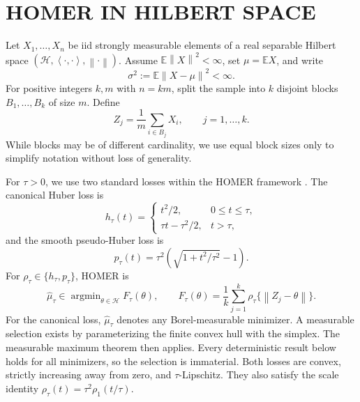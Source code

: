 \documentclass[twoside]{article}
\theoremstyle{definition}
\newcommand{\Hcal}{\mathcal H}
\newcommand{\E}{\mathbb E}
\newcommand{\norm}[1]{\left\lVert #1\right\rVert}
\newcommand{\ip}[2]{\left\langle #1,#2\right\rangle}
\newcommand{\argmin}{\mathop{\mathrm{argmin}}}
\begin{document}
\section{HOMER IN HILBERT SPACE}

Let $X_1,\ldots,X_n$ be iid strongly measurable elements of a real separable Hilbert space $(\Hcal,\ip{\cdot}{\cdot},\norm{\cdot})$. Assume $\E\norm X^2<\infty$, set $\mu=\E X$, and write
\begin{equation}\label{eq:finite-second}
    \sigma^2:=\E\norm{X-\mu}^2<\infty.
\end{equation}
For positive integers $k,m$ with $n=km$, split the sample into $k$ disjoint blocks $B_1,\ldots,B_k$ of size $m$. Define
\begin{equation*}
    Z_j=\frac1m\sum_{i\in B_j}X_i,\qquad j=1,\ldots,k.
\end{equation*}
While blocks may be of different cardinality, we use equal block sizes only to simplify notation without loss of generality.

For $\tau>0$, we use two standard losses within the HOMER framework \citep{huber_1964_RobustEstimationLocation,huber_1981_RobustStatistics}. The canonical Huber loss is
\begin{equation}\label{eq:huber-loss}
    h_\tau(t)=
    \begin{cases}
        t^2/2, & 0\le t\le \tau,\\
        \tau t-\tau^2/2, & t>\tau,
    \end{cases}
\end{equation}
and the smooth pseudo-Huber loss is
\begin{equation}\label{eq:pseudo-huber}
    p_\tau(t)=\tau^2\left(\sqrt{1+t^2/\tau^2}-1\right).
\end{equation}
For $\rho_\tau\in\{h_\tau,p_\tau\}$, HOMER is
\begin{equation*}
    \hat\mu_\tau\in\argmin_{\theta\in\Hcal}
    F_\tau(\theta),\qquad
    F_\tau(\theta)=\frac1k\sum_{j=1}^k
    \rho_\tau\{\norm{Z_j-\theta}\}.
\end{equation*}
For the canonical loss, $\hat\mu_\tau$ denotes any Borel-measurable minimizer. A measurable selection exists by parameterizing the finite convex hull with the simplex. The measurable maximum theorem then applies. Every deterministic result below holds for all minimizers, so the selection is immaterial. Both losses are convex, strictly increasing away from zero, and $\tau$-Lipschitz. They also satisfy the scale identity
$\rho_\tau(t)=\tau^2\rho_1(t/\tau)$.
\end{document}
